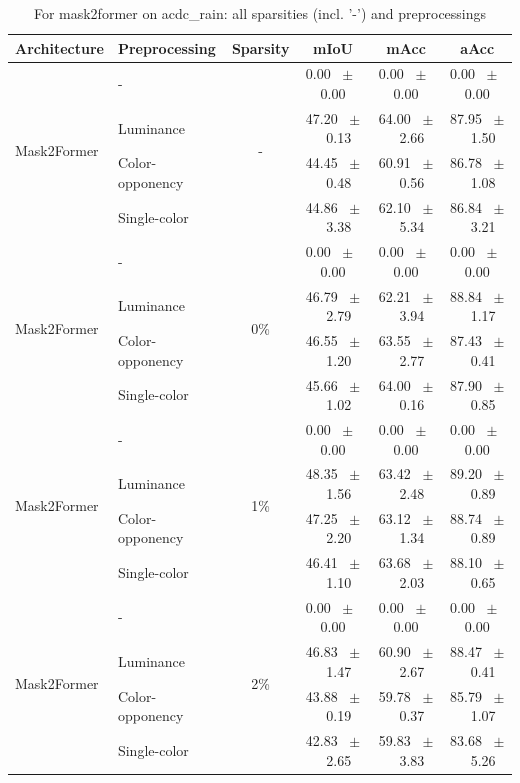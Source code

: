 \begin{table}[h]
  \centering
  \caption{For mask2former on acdc_rain: all sparsities (incl. '-') and preprocessings}
  \begin{tabular}{@{}l l c c c c@{}}
    \toprule
    Architecture & Preprocessing & Sparsity & mIoU & mAcc & aAcc \\
    \midrule
    \multirow{4}{*}{Mask2Former} & - & \multirow{4}{*}{-} & 0.00 ~$\pm$~ 0.00 & 0.00 ~$\pm$~ 0.00 & 0.00 ~$\pm$~ 0.00 \\
    & Luminance &  & 47.20 ~$\pm$~ 0.13 & 64.00 ~$\pm$~ 2.66 & 87.95 ~$\pm$~ 1.50 \\
    & Color-opponency &  & 44.45 ~$\pm$~ 0.48 & 60.91 ~$\pm$~ 0.56 & 86.78 ~$\pm$~ 1.08 \\
    & Single-color &  & 44.86 ~$\pm$~ 3.38 & 62.10 ~$\pm$~ 5.34 & 86.84 ~$\pm$~ 3.21 \\
    \midrule
    \multirow{4}{*}{Mask2Former} & - & \multirow{4}{*}{0\%} & 0.00 ~$\pm$~ 0.00 & 0.00 ~$\pm$~ 0.00 & 0.00 ~$\pm$~ 0.00 \\
    & Luminance &  & 46.79 ~$\pm$~ 2.79 & 62.21 ~$\pm$~ 3.94 & 88.84 ~$\pm$~ 1.17 \\
    & Color-opponency &  & 46.55 ~$\pm$~ 1.20 & 63.55 ~$\pm$~ 2.77 & 87.43 ~$\pm$~ 0.41 \\
    & Single-color &  & 45.66 ~$\pm$~ 1.02 & 64.00 ~$\pm$~ 0.16 & 87.90 ~$\pm$~ 0.85 \\
    \midrule
    \multirow{4}{*}{Mask2Former} & - & \multirow{4}{*}{1\%} & 0.00 ~$\pm$~ 0.00 & 0.00 ~$\pm$~ 0.00 & 0.00 ~$\pm$~ 0.00 \\
    & Luminance &  & 48.35 ~$\pm$~ 1.56 & 63.42 ~$\pm$~ 2.48 & 89.20 ~$\pm$~ 0.89 \\
    & Color-opponency &  & 47.25 ~$\pm$~ 2.20 & 63.12 ~$\pm$~ 1.34 & 88.74 ~$\pm$~ 0.89 \\
    & Single-color &  & 46.41 ~$\pm$~ 1.10 & 63.68 ~$\pm$~ 2.03 & 88.10 ~$\pm$~ 0.65 \\
    \midrule
    \multirow{4}{*}{Mask2Former} & - & \multirow{4}{*}{2\%} & 0.00 ~$\pm$~ 0.00 & 0.00 ~$\pm$~ 0.00 & 0.00 ~$\pm$~ 0.00 \\
    & Luminance &  & 46.83 ~$\pm$~ 1.47 & 60.90 ~$\pm$~ 2.67 & 88.47 ~$\pm$~ 0.41 \\
    & Color-opponency &  & 43.88 ~$\pm$~ 0.19 & 59.78 ~$\pm$~ 0.37 & 85.79 ~$\pm$~ 1.07 \\
    & Single-color &  & 42.83 ~$\pm$~ 2.65 & 59.83 ~$\pm$~ 3.83 & 83.68 ~$\pm$~ 5.26 \\
    \midrule

\end{tabular}
\end{table}
